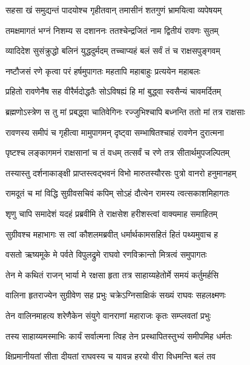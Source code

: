 \twolineshloka
{सहसा खं समुद्यन्तं पादयोश्च गृहीतवान्}
{तमासीनं शतगुणं भ्रामयित्वा व्यपेषयम्} %

\twolineshloka
{तमक्षमागतं भग्नं निशम्य स दशाननः}
{ततश्चेन्द्रजितं नाम द्वितीयं रावणः सुतम्} %

\twolineshloka
{व्यादिदेश सुसंक्रुद्धो बलिनं युद्धदुर्मदम्}
{तच्चाप्यहं बलं सर्वं तं च राक्षसपुङ्गवम्} %

\twolineshloka
{नष्टौजसं रणे कृत्वा परं हर्षमुपागतः}
{महतापि महाबाहुः प्रत्ययेन महाबलः} %

\twolineshloka
{प्रहितो रावणेनैष सह वीरैर्मदोद्धतैः}
{सोऽविषह्यं हि मां बुद्ध्वा स्वसैन्यं चावमर्दितम्} %

\twolineshloka
{ब्रह्मणोऽस्त्रेण स तु मां प्रबद्ध्वा चातिवेगिनः}
{रज्जुभिश्चापि बध्नन्ति ततो मां तत्र राक्षसाः} %

\twolineshloka
{रावणस्य समीपं च गृहीत्वा मामुपागमन्}
{दृष्ट्वा सम्भाषितश्चाहं रावणेन दुरात्मना} %

\twolineshloka
{पृष्टश्च लङ्कागमनं राक्षसानां च तं वधम्}
{तत्सर्वं च रणे तत्र सीतार्थमुपजल्पितम्} %

\twolineshloka
{तस्यास्तु दर्शनाकाङ्क्षी प्राप्तस्त्वद्भवनं विभो}
{मारुतस्यौरसः पुत्रो वानरो हनुमानहम्} %

\twolineshloka
{रामदूतं च मां विद्धि सुग्रीवसचिवं कपिम्}
{सोऽहं दौत्येन रामस्य त्वत्सकाशमिहागतः} %

\twolineshloka
{शृणु चापि समादेशं यदहं प्रब्रवीमि ते}
{राक्षसेश हरीशस्त्वां वाक्यमाह समाहितम्} %

\twolineshloka
{सुग्रीवश्च महाभागः स त्वां कौशलमब्रवीत्}
{धर्मार्थकामसहितं हितं पथ्यमुवाच ह} %

\twolineshloka
{वसतो ऋष्यमूके मे पर्वते विपुलद्रुमे}
{राघवो रणविक्रान्तो मित्रत्वं समुपागतः} %

\twolineshloka
{तेन मे कथितं राजन् भार्या मे रक्षसा हृता}
{तत्र साहाय्यहेतोर्मे समयं कर्तुमर्हसि} %

\twolineshloka
{वालिना हृतराज्येन सुग्रीवेण सह प्रभुः}
{चक्रेऽग्निसाक्षिकं सख्यं राघवः सहलक्ष्मणः} %

\twolineshloka
{तेन वालिनमाहत्य शरेणैकेन संयुगे}
{वानराणां महाराजः कृतः सम्प्लवतां प्रभुः} %

\twolineshloka
{तस्य साहाय्यमस्माभिः कार्यं सर्वात्मना त्विह}
{तेन प्रस्थापितस्तुभ्यं समीपमिह धर्मतः} %

\twolineshloka
{क्षिप्रमानीयतां सीता दीयतां राघवस्य च}
{यावन्न हरयो वीरा विधमन्ति बलं तव} %

